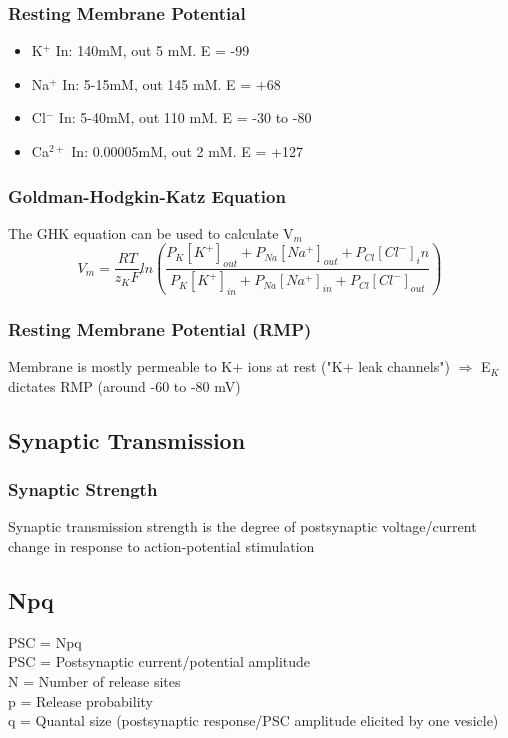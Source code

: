 \begin{itemize}
\subsubsection{Resting Membrane Potential}
\begin{itemize}
    \item K$^{+}$ In: 140mM, out 5 mM. E = -99
    \item Na$^{+}$ In: 5-15mM, out 145 mM. E = +68
     \item Cl$^{-}$ In: 5-40mM, out 110 mM. E = -30 to -80
      \item Ca$^{2+}$ In: 0.00005mM, out 2 mM. E = +127
\end{itemize}

\subsubsection{Goldman-Hodgkin-Katz Equation}
The GHK equation can be used to calculate V$_{m}$
\[V_{m} = \frac{RT}{z_{K}F}ln(\frac{P_{K}[K^{+}]_{out}+P_{Na}[Na^{+}]_{out}+P_{Cl}[Cl^{-}]_in}{P_{K}[K^{+}]_{in}+P_{Na}[Na^{+}]_{in}+P_{Cl}[Cl^{-}]_{out}})\]
\subsubsection{Resting Membrane Potential (RMP)}
Membrane is mostly permeable to K+ ions at rest ("K+ leak channels") $\Rightarrow$ E$_{K}$ dictates RMP (around -60 to -80 mV)
\subsection{Synaptic Transmission}
\subsubsection{Synaptic Strength}
Synaptic transmission strength is the degree of postsynaptic voltage/current change in response to action-potential stimulation


\subsection{Npq}
PSC = Npq
\\PSC = Postsynaptic current/potential amplitude
\\N = Number of release sites
\\p = Release probability
\\q = Quantal size (postsynaptic response/PSC amplitude elicited by one vesicle)



\end{itemize}
